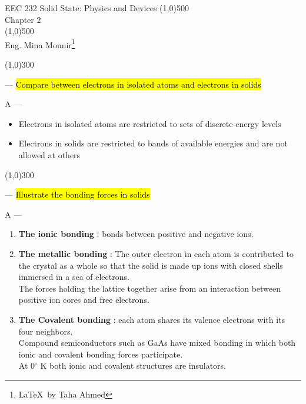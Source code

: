 \documentclass[12pt,a4paper]{article}
\newcounter{question}
\newcommand\Que[1]{
   \line(1,0){300}
   \leavevmode\par
   \stepcounter{question}
   \noindent
   \fbox{\thequestion. Q} --- \hl{#1}\par}
\newcommand\Ans[2][]{%
    \leavevmode\par\noindent
   {\leftskip16pt
    A --- \textbf{#1}#2\par}}
\begin{document}
\begin{titlepage}
\begin{center}
\vspace*{0.5cm}
EEC 232 Solid State: Physics and Devices
\vfill
\line(1,0){500}\\
\Huge{Chapter 2} \\
\line(1,0){500}\\
\vfill
{\LARGE Eng. Mina Mounir\footnote{{\normalsize \LaTeX\ by Taha Ahmed}}}
\vfill


\end{center}

\end{titlepage}

\begin{large}




\Que{Compare between electrons in isolated atoms and electrons in solids}
\Ans{
\begin{itemize}


\item Electrons in isolated atoms are restricted to sets of discrete energy levels\\
\item Electrons in solids are restricted to bands of available energies and are not allowed at others 
\end{itemize}
}

\Que{Illustrate the bonding forces in solids}
\Ans{

\begin{enumerate}
\item \textbf{The ionic bonding} : bonds between positive and negative ions.

\item \textbf{The metallic bonding} : The outer electron in each atom is contributed to the crystal as a whole so that the solid is made up ions with closed shells immersed in a sea of electrons. \\ The forces holding the lattice together arise from an interaction between positive ion cores and free electrons.
\item \textbf{The Covalent bonding} : each atom shares its valence electrons with its four neighbors.\\ Compound semiconductors such as GaAs have mixed bonding in which both ionic and covalent bonding forces participate.\\ At $0^{\circ}$ K both ionic and covalent structures are insulators.
\end{enumerate}
}


\end{large}
\end{document}
